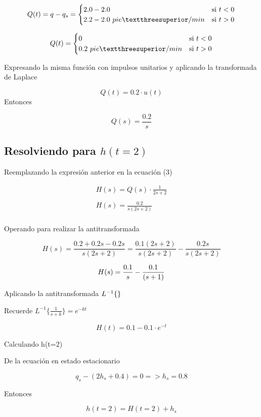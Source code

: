 \documentclass[
  letterpaper,
  DIV=11,
  numbers=noendperiod]{scrreprt}
\begin{document}
\[
Q(t)=q-q_s=
\begin{cases}
   2.0-2.0 &\text{si } t < 0 \\
   2.2-2.0 \space\ pie³/min &\text{si } t>0\\
\end{cases}
\]

\[
Q(t)=
\begin{cases}
   0 &\text{si } t < 0 \\
   0.2 \space\ pie³/min &\text{si } t>0\\
\end{cases}
\]

Expresando la misma función con impulsos unitarios y aplicando la
transformada de Laplace

\[
Q(t) = 0.2\cdot u(t)
\] Entonces

\[
Q(s) = \frac{0.2}{s}
\]

\hypertarget{resolviendo-para-ht2}{%
\subsection{\texorpdfstring{Resolviendo para
\(h(t=2)\)}{Resolviendo para h(t=2)}}\label{resolviendo-para-ht2}}

Reemplazando la expresión anterior en la ecuación (3)

\[
\begin{array}{l}
H(s)= Q(s)\cdot \frac{1}{2s+2} \\
\\
H(s) = \frac{0.2}{s(2s+2)}\\
\end{array}
\]

Operando para realizar la antitransformada

\[
H(s) = \frac{0.2+0.2s-0.2s}{s(2s+2)}=\frac{0.1(2s+2)}{s(2s+2)}-\frac{0.2s}{s(2s+2)}
\]

\[
H(s) = \frac{0.1}{s}-\frac{0.1}{(s+1)}\\
\]

Aplicando la antitransformada \(L^{-1}\{\space\}\)

Recuerde \(L^{-1}\{\frac{1}{s+k}\}= e^{-kt}\)

\[
H(t) = 0.1-0.1\cdot e^{-t}
\]

Calculando h(t=2)

De la ecuación en estado estacionario

\[
q_s-(2h_s+0.4)=0 => h_s=0.8
\]

Entonces

\[
h(t=2) = H(t=2) + h_s
\]
\end{document}

